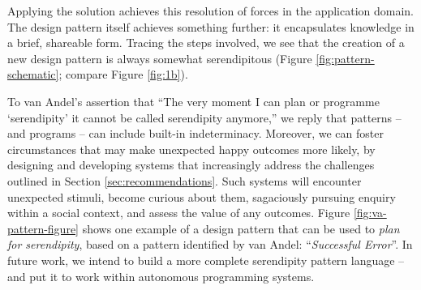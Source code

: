 %
%
Applying the solution achieves this resolution of forces in the
application domain.
The design pattern itself achieves something further: it encapsulates
knowledge in a brief, shareable form.  Tracing the steps involved, we
see that the creation of a new design pattern is always somewhat
serendipitous (Figure \ref{fig:pattern-schematic}; compare Figure
\ref{fig:1b}).

To van Andel's assertion that ``The very moment I can plan or
programme `serendipity' it cannot be called serendipity anymore,'' we
reply that patterns -- and programs -- can include built-in
indeterminacy.  Moreover, we can foster circumstances that may make
unexpected happy outcomes more likely, by designing and developing
systems that increasingly address the challenges outlined in Section
\ref{sec:recommendations}.  Such systems will encounter unexpected
stimuli, become curious about them, sagaciously pursuing enquiry
within a social context, and assess the value of any outcomes.
%
Figure \ref{fig:va-pattern-figure} shows one example of a design
pattern that can be used to \emph{plan for serendipity}, based on a
pattern identified by van Andel: ``\emph{Successful Error}''.  In
future work, we intend to build a more complete serendipity pattern
language -- and put it to work within autonomous programming systems.




